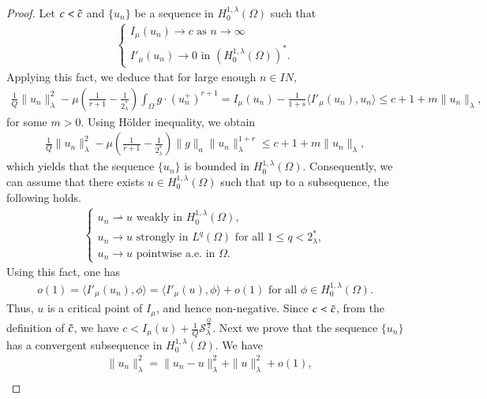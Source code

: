 \documentclass[12pt, notitlepage]{article}
\def\N{{I\!\!N}}
\begin{document}
{\begin{proof}
Let $c<\Tilde{c}$ and $\{u_n\}$ be a sequence in $H^{1,\lambda}_0(\Omega)$ such that 
\begin{align}\label{W5}
    \begin{cases}
        I_\mu(u_n)\to c \text{ as } n\to\infty\\
        I'_\mu(u_n)\to 0 \text{ in } (H^{1,\lambda}_0(\Omega))^*.
    \end{cases}
\end{align}
Applying this fact, we deduce that for large enough $n\in\N,$
\begin{align*}
    \frac{1}{Q}\|u_n\|^2_\lambda-\mu\left (\frac{1}{r+1}-\frac{1}{2^*_\lambda}\right )\int_\Omega g\cdot(u_n^+)^{r+1}=I_\mu(u_n)-\frac{1}{1+s}\langle I'_\mu(u_n),u_n\rangle\leq c+1+m\|u_n\|_\lambda,
    \end{align*}
  for some $m>0$. Using H\"{o}lder inequality, we obtain
    \begin{align}\label{BDD}
         \frac{1}{Q}\|u_n\|_\lambda^2-\mu\left (\frac{1}{r+1}-\frac{1}{2^*_\lambda}\right )\|g\|_a\|u_n\|_\lambda^{1+r}\leq c+1+m\|u_n\|_\lambda,
    \end{align}
   which yields that the sequence $\{u_n\}$ is bounded in $H^{1,\lambda}_0(\Omega)$. Consequently, we can assume that there exists $u\in H^{1,\lambda}_0(\Omega)$ such that up to a subsequence, the following holds.
   \begin{align}\label{Lab}
        \begin{cases}
       u_n\rightharpoonup u \text{ weakly in }H^{1,\lambda}_0(\Omega),\\
        u_n\to u \text{ strongly in } L^{q}(\Omega) \text{ for all }1\leq q< 2^*_\lambda,\\
        u_n\to u \text{ pointwise a.e. in }\Omega.
    \end{cases}
   \end{align}
 Using this fact, one has
\begin{align}\label{W3}
    o(1)=\langle I'_\mu(u_n),\phi\rangle=\langle I'_\mu(u),\phi\rangle+o(1) \text{ for all }\phi\in H^{1,\lambda}_0(\Omega).
\end{align}
Thus, $u$ is a critical point of $I_\mu$, and hence non-negative. Since $c<\Tilde{c}$, from the definition of $\Tilde{c}$, we have $c<I_\mu(u)+\frac{1}{Q}\mathcal{S}_\lambda^\frac{Q}{2}$. Next we prove that the sequence $\{u_n\}$ has a convergent subsequence in $H^{1,\lambda}_0(\Omega)$. We have
\begin{align}
    &\|u_n\|_\lambda^2=\|u_n-u\|_\lambda^2+\|u\|_\lambda^2+o(1)\label{W1},\\

\end{align}
\end{proof}}
\end{document}
